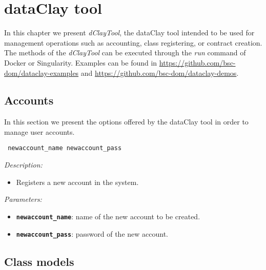 
\chapter{dataClay tool}
\label{sec:dClayTool}

In this chapter we present \textit{dClayTool}, the dataClay tool intended to be used for management operations such as accounting, class registering, or contract creation. The methods of the \textit{dClayTool} can be executed through the \textit{run} command of Docker or Singularity. Examples can be found in \href{https://github.com/bsc-dom/dataclay-examples}{https://github.com/bsc-dom/dataclay-examples} and \href{https://github.com/bsc-dom/dataclay-demos}{https://github.com/bsc-dom/dataclay-demos}.

\section{Accounts}

In this section we present the options offered by the dataClay tool in order to manage user accounts.


\begin{dBox}
\texttt{ newaccount\_name newaccount\_pass}
\LINE

{\it Description:}

\begin{itemize}
    \item Registers a new account in the system.
\end{itemize}

{\it Parameters:}

\begin{itemize}
    \item \texttt{\bfseries newaccount\_name}: name of the new account to be created.
    \item \texttt{\bfseries newaccount\_pass}: password of the new account.
\end{itemize}
 
\end{dBox}

\section{Class models}
\label{sec:newModel}

